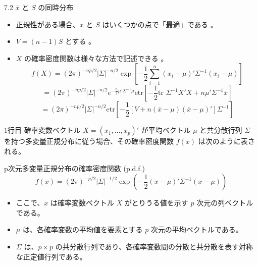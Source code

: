 \documentclass[aspectratio=169]{beamer}
\begin{document}
\begin{CJK}{UTF8}{min}
\begin{frame}{7.2 $\bar{x}$ と $S$ の同時分布}
\begin{itemize}
    \item 正規性がある場合、$\bar{x}$ と $S$ はいくつかの点で「最適」である 。
    \item $V=(n-1)S$ とする 。
    \item $X$ の確率密度関数は様々な方法で記述できる 。
    \begin{equation*}
    f(X) = (2\pi)^{-np/2} |\Sigma|^{-n/2} \exp\left[-\frac{1}{2} \sum_{i=1}^{n} (x_i - \mu)' \Sigma^{-1} (x_i - \mu)\right] \tag{7.1}
    \end{equation*}
    \begin{equation*}
    = (2\pi)^{-np/2} |\Sigma|^{-n/2} e^{-\frac{n}{2}\mu'\Sigma^{-1}\mu} \text{etr}\left[-\frac{1}{2}\text{tr }\Sigma^{-1}X'X + n\mu'\Sigma^{-1}\bar{x}\right] 
    \end{equation*}
    \begin{equation*}
    = (2\pi)^{-np/2} |\Sigma|^{-n/2} \text{etr}\left[-\frac{1}{2}[V + n(\bar{x} - \mu)(\bar{x} - \mu)']\Sigma^{-1}\right] 
    \end{equation*}
\end{itemize}
\end{frame}

\begin{frame}{1行目}
確率変数ベクトル $X = (x_1, \dots, x_p)'$ が平均ベクトル $\mu$ と共分散行列 $\Sigma$ を持つ多変量正規分布に従う場合、その確率密度関数 $f(x)$ は次のように表される。
\begin{block}{p次元多変量正規分布の確率密度関数 (p.d.f.)}
\begin{equation*}
f(x) = (2\pi)^{-p/2} |\Sigma|^{-1/2} \exp\left(-\frac{1}{2}(x - \mu)'\Sigma^{-1}(x - \mu)\right)
\end{equation*}
\end{block}
\begin{itemize}
\item ここで、$x$ は確率変数ベクトル $X$ がとりうる値を示す $p$ 次元の列ベクトルである。
\item $\mu$ は、各確率変数の平均値を要素とする $p$ 次元の平均ベクトルである。
\item $\Sigma$ は、$p \times p$ の共分散行列であり、各確率変数間の分散と共分散を表す対称な正定値行列である。
\end{itemize}
\end{frame}


\end{CJK}
\end{document}

